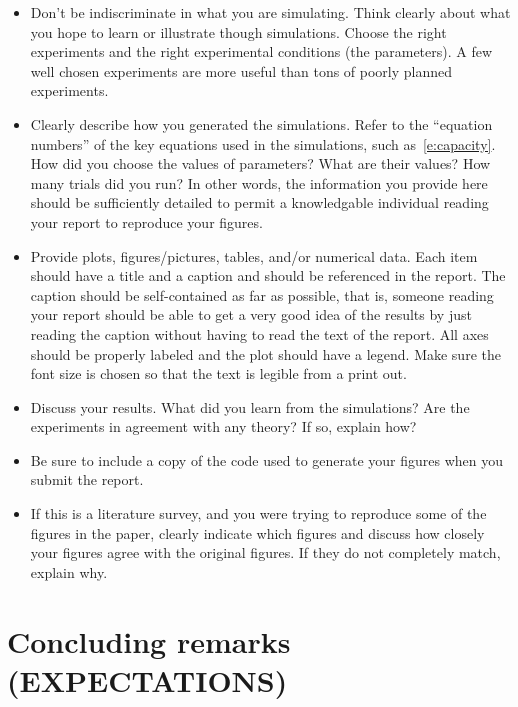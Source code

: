 \documentclass[article,11pt,onecolumn,final]{IEEEtran}
\begin{document}
\begin{itemize}
\item Don't be indiscriminate in what
you are simulating. Think clearly about what you hope to learn or
illustrate though simulations. Choose the right experiments and the
right experimental conditions (the parameters). A few well chosen experiments
are more useful than tons of poorly planned experiments.

\item Clearly describe how you generated the simulations. Refer to the ``equation numbers'' of the key equations used in the simulations, such as~\eqref{e:capacity}.
 How did you choose
the values of parameters? What are their values? How many
trials did you run? In other words, the information you
provide here should be sufficiently detailed to permit a knowledgable
individual reading your report to reproduce your figures.

\item Provide plots, figures/pictures,
tables, and/or numerical data. Each item should have a title and a
caption and should be referenced in the report. The caption should be
self-contained as far as possible, that is, someone reading your
report should be able to get a very good idea of the results by just
reading the caption without having to read the text of the
report. All axes should be properly
labeled and the plot should have a legend. Make sure the font size is chosen so that the 
text is legible from a print out.

\item Discuss your results. What did you learn from the
simulations? Are the experiments in agreement with any theory? If so,
explain how? 

\item Be sure to include a copy of the code used to generate your figures when you submit the report.

\item If this is a literature survey, and you were trying to reproduce some of the figures in the paper, clearly indicate which figures and discuss how closely your figures agree with the original figures. If they do not completely match, explain why.

\end{itemize}

\section{Concluding remarks (EXPECTATIONS)}
\end{document}
